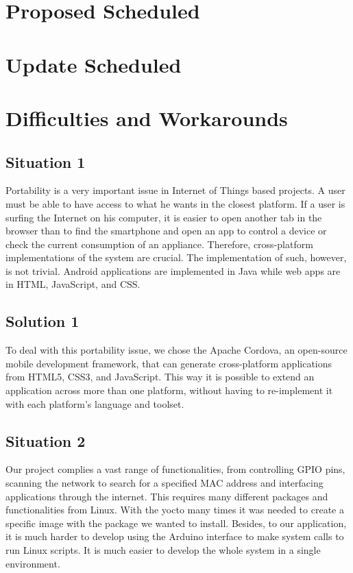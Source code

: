 \documentclass[12pt]{partialreport}
\begin{document}
\maketitle
\content

\section*{Proposed Scheduled}
\oldScheduleTable

\section*{Update Scheduled}
\newScheduleTable

\section*{Difficulties and Workarounds}
\subsection*{Situation 1}
Portability is a very important issue in Internet of Things based projects. A user must be able to have access to what he wants in the closest platform. If a user is surfing the Internet on his computer, it is easier to open another tab in the browser than to find the smartphone and open an app to control a device or check the current consumption of an appliance. Therefore, cross-platform implementations of the system are crucial. The implementation of such, however, is not trivial. Android applications are implemented in Java while web apps are in HTML, JavaScript, and CSS.
\subsection*{Solution  1}
To deal with this portability issue, we chose the Apache Cordova, an open-source mobile development framework, that can generate cross-platform applications from HTML5, CSS3, and JavaScript. This way it is possible to extend an application across more than one platform, without having to re-implement it with each platform's language and toolset.

\subsection*{Situation 2}
Our project complies a vast range of functionalities, from controlling GPIO pins, scanning the network to search for a specified MAC address and interfacing applications through the internet. This requires many different packages and functionalities from Linux. With the yocto many times it was needed to create a specific image with the package we wanted to install. Besides, to our application, it is much harder to develop using the Arduino interface to make system calls to run Linux scripts. It is much easier to develop the whole system in a single environment.
\end{document}
